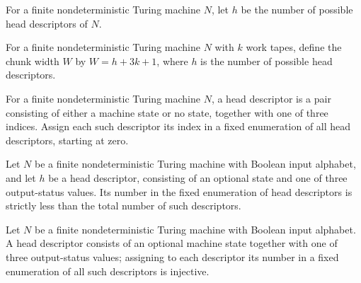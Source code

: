 \begin{definition}
\label{Complexity.Codec.hH}
\leanok
{}
For a finite nondeterministic Turing machine $N$, let $h$ be the number of possible head
descriptors of $N$.
\end{definition}

\begin{definition}
\label{Complexity.Codec.W}
\leanok
{}
For a finite nondeterministic Turing machine $N$ with $k$ work tapes, define the chunk
width $W$ by $W=h+3k+1$, where $h$ is the number of possible head descriptors.
\end{definition}

\begin{definition}
\label{Complexity.Codec.hdNum}
\leanok
{}
For a finite nondeterministic Turing machine $N$, a head descriptor is a pair consisting
of either a machine state or no state, together with one of three indices. Assign each
such descriptor its index in a fixed enumeration of all head descriptors, starting at
zero.
\end{definition}

\begin{lemma}
\label{Complexity.Codec.hdNum_lt}
\leanok
{}
Let $N$ be a finite nondeterministic Turing machine with Boolean input alphabet, and let
$h$ be a head descriptor, consisting of an optional state and one of three output-status
values. Its number in the fixed enumeration of head descriptors is strictly less than
the total number of such descriptors.
\end{lemma}

\begin{lemma}
\label{Complexity.Codec.hdNum_injective}
\leanok
{}
Let $N$ be a finite nondeterministic Turing machine with Boolean input alphabet. A head
descriptor consists of an optional machine state together with one of three
output-status values; assigning to each descriptor its number in a fixed enumeration of
all such descriptors is injective.
\end{lemma}

